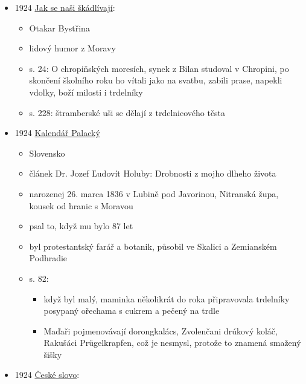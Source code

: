 \begin{itemize}
  \begin{itemize}
  \tightlist
  \item
     Pan revisor. Z historie domu U Nesených. -\/-
    Alfa
  \item
    1. vyjednává se o podnájemníkovi
  \item
    manžel navrhuje manželce, že by pronajali pokoj. ta zrovna smaží
    trdelníky.
  \end{itemize}
\item
  1924
  \href{https://ceskadigitalniknihovna.cz/uuid/uuid:2dbf7a20-4967-11e4-aded-005056827e51}{Jak
  se naši škádlívají}:

  \begin{itemize}
  \tightlist
  \item
    Otakar Bystřina
  \item
    lidový humor z Moravy
  \item
    s. 24: O chropiňských moresích, synek z Bilan studoval v Chropini,
    po skončení školního roku ho vítali jako na svatbu, zabili prase,
    napekli vdolky, boží milosti i trdelníky
  \item
    s. 228: štramberské uši se dělají z trdelnicového těsta
  \end{itemize}
\item
  1924
  \href{https://ceskadigitalniknihovna.cz/uuid/uuid:f0cbc280-f31d-11ed-8fba-005056827e51}{Kalendář
  Palacký}

  \begin{itemize}
  \tightlist
  \item
    Slovensko
  \item
    článek Dr. Jozef Ľudovít Holuby: Drobnosti z mojho dlheho života
  \item
    narozenej 26. marca 1836 v Lubině pod Javorinou, Nitranská župa,
    kousek od hranic s Moravou
  \item
    psal to, když mu bylo 87 let
  \item
    byl protestantský farář a botanik, působil ve Skalici a Zemianském
    Podhradie
  \item
    s. 82:

    \begin{itemize}
    \tightlist
    \item
      když byl malý, maminka několikrát do roka připravovala trdelníky
      posypaný ořechama s cukrem a pečený na trdle
    \item
      Maďaři pojmenovávají dorongkalács, Zvolenčani drúkový koláč,
      Rakušáci Prügelkrapfen, což je nesmysl, protože to znamená smažený
      šišky
    \end{itemize}
  \end{itemize}
\item
  1924
  \href{https://ceskadigitalniknihovna.cz/uuid/uuid:a382bc3a-7825-4663-992a-f6e93b38a656}{České
  slovo}:


\end{itemize}
